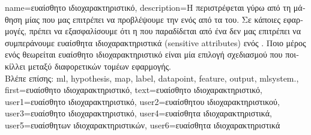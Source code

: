 {name={\foreignlanguage{greek}{ευαίσθητο ιδιοχαρακτηριστικό}},
	description={\foreignlanguage{greek}{Η}  
		\foreignlanguage{greek}{περιστρέφεται γύρω από τη μάθηση μίας}   
		\foreignlanguage{greek}{που μας επιτρέπει να προβλέψουμε την}  \foreignlanguage{greek}{ενός} 
		 \foreignlanguage{greek}{από τα}  \foreignlanguage{greek}{του}. 
		\foreignlanguage{greek}{Σε κάποιες εφαρμογές, πρέπει να εξασφαλίσουμε ότι η}  
		\foreignlanguage{greek}{που παραδίδεται από ένα}  \foreignlanguage{greek}{δεν μας επιτρέπει 
		να συμπεράνουμε ευαί\-σθητα ιδιοχαρακτηριστικά} (sensitive attributes) \foreignlanguage{greek}{ενός} . 
		\foreignlanguage{greek}{Ποιο μέρος ενός}  \foreignlanguage{greek}{θεωρείται ευαίσθητο ιδιοχαρακτηριστικό 
		είναι μία επιλογή σχεδιασμού που ποικίλλει μεταξύ διαφορετικών τομέων εφαρμογής.}
		\\
		\foreignlanguage{greek}{Βλέπε επίσης:} \gls{ml}, \gls{hypothesis}, \gls{map}, \gls{label}, \gls{datapoint}, \gls{feature}, \gls{output}, 
		\gls{mlsystem}.},
	first={\foreignlanguage{greek}{ευαίσθητο ιδιοχαρακτηριστικό}},
	text={\foreignlanguage{greek}{ευαίσθητο ιδιοχαρακτηριστικό}},
	user1={\foreignlanguage{greek}{ευαίσθητο ιδιοχαρακτηριστικό}}, %
    	user2={\foreignlanguage{greek}{ευαίσθητου ιδιοχαρακτηριστικού}}, %
	user3={\foreignlanguage{greek}{ευαίσθητο ιδιοχαρακτηριστικό}}, %
	user4={\foreignlanguage{greek}{ευαίσθητα ιδιοχαρακτηριστικά}}, %
    	user5={\foreignlanguage{greek}{ευαίσθητων ιδιοχαρακτηριστικών}}, %
	user6={\foreignlanguage{greek}{ευαί\-σθητα ιδιοχαρακτηριστικά}} %
}

